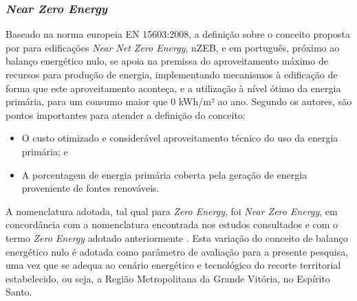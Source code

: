 \subsubsection{\textit{Near Zero Energy}}
 Baseado na norma europeia EN 15603:2008, a definição sobre o conceito proposta por
 \textcite{Kurnitski2011a} para edificações \textit{Near Net Zero Energy}, nZEB, e 
 em português, próximo ao balanço energético nulo, se apoia na premissa do aproveitamento 
 máximo de recursos para produção de energia, implementando mecanismos à edificação 
 de forma que este aproveitamento aconteça, e a utilização à nível ótimo da energia 
 primária, para um consumo maior que 0 kWh/m² ao ano. Segundo os autores, são pontos 
 importantes para atender a definição do conceito:
\begin{itemize}
    \item O custo otimizado e considerável aproveitamento técnico do uso da energia primária; e
    \item A porcentagem de energia primária coberta pela geração de energia proveniente de 
    fontes renováveis.
\end{itemize}
A nomenclatura adotada, tal qual para \textit{Zero Energy}, foi \textit{Near Zero Energy}, 
em concordância com a nomenclatura encontrada nos estudos consultados e com o termo 
\textit{Zero Energy} adotado anteriormente \cite{AmericanSocietyofHeatingRefrigeratingandAir-ConditioningEngineers-ASHRAE2019}.
Esta variação do conceito de balanço energético nulo é adotada como parâmetro de avaliação 
para a presente pesquisa, uma vez que se adequa ao cenário energético e tecnológico do 
recorte territorial estabelecido, ou seja, a Região Metropolitana da Grande Vitória, no 
Espírito Santo.

